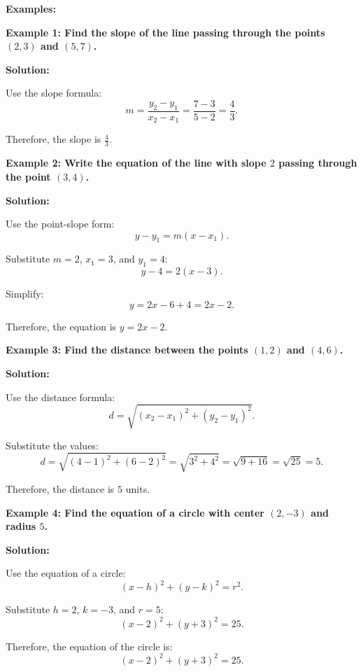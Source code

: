 \textbf{Examples:}

\begin{flushleft}
	\textbf{Example 1: Find the slope of the line passing through the points $(2, 3)$ and $(5, 7)$.}
	
	\vspace{0.5cm}
	\textbf{Solution:}
	\vspace{0.5cm}
	
	Use the slope formula:
	\[
	m = \frac{y_2 - y_1}{x_2 - x_1} = \frac{7 - 3}{5 - 2} = \frac{4}{3}.
	\]
	
	Therefore, the slope is $\frac{4}{3}$.
\end{flushleft}

\begin{flushleft}
	\textbf{Example 2: Write the equation of the line with slope $2$ passing through the point $(3, 4)$.}
	
	\vspace{0.5cm}
	\textbf{Solution:}
	\vspace{0.5cm}
	
	Use the point-slope form:
	\[
	y - y_1 = m(x - x_1).
	\]
	
	Substitute $m = 2$, $x_1 = 3$, and $y_1 = 4$:
	\[
	y - 4 = 2(x - 3).
	\]
	
	Simplify:
	\[
	y = 2x - 6 + 4 = 2x - 2.
	\]
	
	Therefore, the equation is $y = 2x - 2$.
\end{flushleft}

\begin{flushleft}
	\textbf{Example 3: Find the distance between the points $(1, 2)$ and $(4, 6)$.}
	
	\vspace{0.5cm}
	\textbf{Solution:}
	\vspace{0.5cm}
	
	Use the distance formula:
	\[
	d = \sqrt{(x_2 - x_1)^2 + (y_2 - y_1)^2}.
	\]
	
	Substitute the values:
	\[
	d = \sqrt{(4 - 1)^2 + (6 - 2)^2} = \sqrt{3^2 + 4^2} = \sqrt{9 + 16} = \sqrt{25} = 5.
	\]
	
	Therefore, the distance is $5$ units.
\end{flushleft}

\begin{flushleft}
	\textbf{Example 4: Find the equation of a circle with center $(2, -3)$ and radius $5$.}
	
	\vspace{0.5cm}
	\textbf{Solution:}
	\vspace{0.5cm}
	
	Use the equation of a circle:
	\[
	(x - h)^2 + (y - k)^2 = r^2.
	\]
	
	Substitute $h = 2$, $k = -3$, and $r = 5$:
	\[
	(x - 2)^2 + (y + 3)^2 = 25.
	\]
	
	Therefore, the equation of the circle is:
	\[
	(x - 2)^2 + (y + 3)^2 = 25.
	\]
\end{flushleft}

